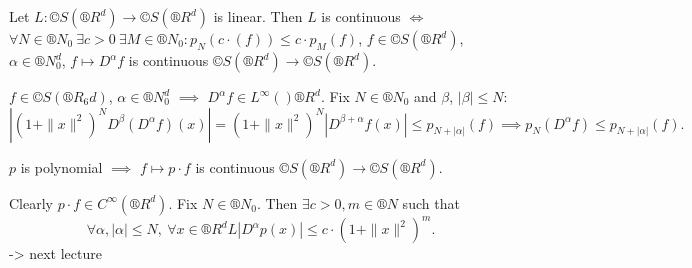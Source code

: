 \documentclass[12pt]{article}					%
\begin{document}
\begin{lemma}
	Let $L: ©S(®R^d) \rightarrow ©S(®R^d)$ is linear. Then $L$ is continuous $\Leftrightarrow$ $\forall N \in ®N_0\ \exists c > 0\ \exists M \in ®N_0: p_N(c·(f)) ≤ c·p_M(f)$, $f \in ©S(®R^d)$, $α \in ®N_0^d$, $f \mapsto D^α f$ is continuous $©S(®R^d) \rightarrow ©S(®R^d)$.

	\begin{dukazin}
		$f \in ©S(®R_6d)$, $α \in ®N_0^d$ $\implies$ $D^α f \in L^∞()®R^d$. Fix $N \in ®N_0$ and $β$, $|β| ≤ N$:
		$$ |(1 + \|x\|^2)^N D^β(D^α f)(x)| = (1 + \|x\|^2)^N |D^{β+α} f(x)| ≤ p_{N + |α|}(f) \implies p_N(D^α f) ≤ p_{N+|α|}(f). $$
	\end{dukazin}
\end{lemma}

\begin{poznamka}
	$p$ is polynomial $\implies$ $f \mapsto p·f$ is continuous $©S(®R^d) \rightarrow ©S(®R^d)$.

	\begin{dukazin}
		Clearly $p·f \in C^∞(®R^d)$. Fix $N \in ®N_0$. Then $\exists c > 0, m \in ®N$ such that
		$$ \forall α, |α| ≤ N,\ \forall x \in ®R^dL |D^α p(x)| ≤ c·(1 + \|x\|^2)^m. $$
		-> next lecture
	\end{dukazin}
\end{poznamka}
\end{document}
